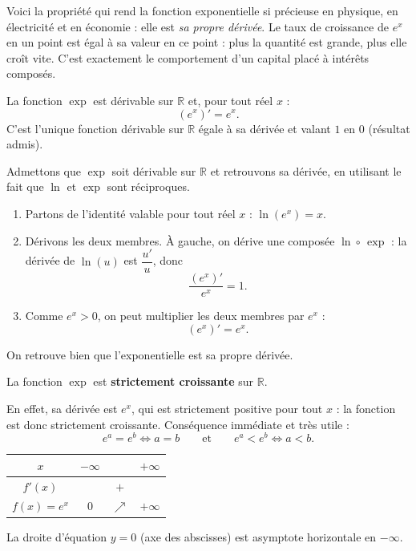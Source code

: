 \documentclass[11pt]{article}
\newcounter{popsec}
\newcounter{popsub}
\newcommand{\courssub}[1]{%
  \stepcounter{popsub}%
  \par\vspace{9pt}\noindent{\popxbold\fontsize{11.5}{13}\selectfont\color{popink}{\color{poporange}\thepopsec.\thepopsub}\hspace{6pt}#1}\par\nopagebreak\vspace{4pt}
}
\begin{document}
\courssub{Dérivée et sens de variation}

Voici la propriété qui rend la fonction exponentielle si précieuse en physique, en électricité et en économie : elle est \emph{sa propre dérivée}. Le taux de croissance de $e^{x}$ en un point est égal à sa valeur en ce point : plus la quantité est grande, plus elle croît vite. C'est exactement le comportement d'un capital placé à intérêts composés.

\begin{propriete}
La fonction $\exp$ est dérivable sur $\mathbb{R}$ et, pour tout réel $x$ :
\[ \left(e^{x}\right)' = e^{x}. \]
C'est l'unique fonction dérivable sur $\mathbb{R}$ égale à sa dérivée et valant $1$ en $0$ (résultat admis).
\end{propriete}

\begin{experience}
Admettons que $\exp$ soit dérivable sur $\mathbb{R}$ et retrouvons sa dérivée, en utilisant le fait que $\ln$ et $\exp$ sont réciproques.
\begin{enumerate}
\item Partons de l'identité valable pour tout réel $x$ : $\ln\left(e^{x}\right) = x$.
\item Dérivons les deux membres. À gauche, on dérive une composée $\ln \circ\, \exp$ : la dérivée de $\ln(u)$ est $\dfrac{u'}{u}$, donc
\[ \frac{\left(e^{x}\right)'}{e^{x}} = 1. \]
\item Comme $e^{x} > 0$, on peut multiplier les deux membres par $e^{x}$ :
\[ \left(e^{x}\right)' = e^{x}. \]
\end{enumerate}
On retrouve bien que l'exponentielle est sa propre dérivée.
\end{experience}

\begin{propriete}
La fonction $\exp$ est \textbf{strictement croissante} sur $\mathbb{R}$.
\end{propriete}

En effet, sa dérivée est $e^{x}$, qui est strictement positive pour tout $x$ : la fonction est donc strictement croissante. Conséquence immédiate et très utile :
\[ e^{a} = e^{b} \iff a = b \qquad \text{et} \qquad e^{a} < e^{b} \iff a < b. \]

\begin{propriete}
\begin{center}
\begin{tabular}{|c|ccc|}\hline
$x$ & $-\infty$ & & $+\infty$ \\ \hline
$f'(x)$ & & $+$ & \\ \hline
$f(x)=e^x$ & $0$ & $\nearrow$ & $+\infty$ \\ \hline
\end{tabular}
\end{center}
La droite d'équation $y=0$ (axe des abscisses) est asymptote horizontale en $-\infty$.
\end{propriete}
\end{document}
